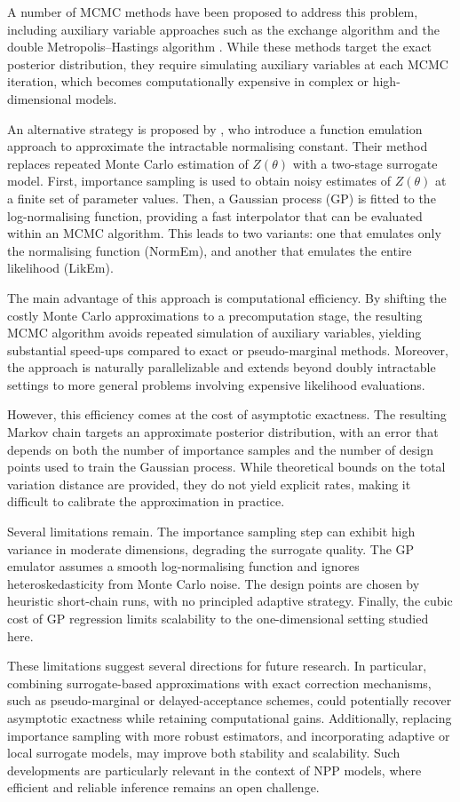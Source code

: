 A number of MCMC methods have been proposed to address this problem, including auxiliary variable approaches such as the exchange algorithm and the double Metropolis--Hastings algorithm \cite{liang2009}.
While these methods target the exact posterior distribution, they require simulating auxiliary variables at each MCMC iteration, which becomes computationally expensive in complex or high-dimensional models.

An alternative strategy is proposed by , who introduce a function emulation approach to approximate the intractable normalising constant. Their method replaces repeated Monte Carlo estimation of $Z(\theta)$ with a two-stage surrogate model.
First, importance sampling is used to obtain noisy estimates of $Z(\theta)$ at a finite set of parameter values.
Then, a Gaussian process (GP) is fitted to the log-normalising function, providing a fast interpolator that can be evaluated within an MCMC algorithm.
This leads to two variants: one that emulates only the normalising function (NormEm), and another that emulates the entire likelihood (LikEm).

The main advantage of this approach is computational efficiency.
By shifting the costly Monte Carlo approximations to a precomputation stage, the resulting MCMC algorithm avoids repeated simulation of auxiliary variables, yielding substantial speed-ups compared to exact or pseudo-marginal methods.
Moreover, the approach is naturally parallelizable and extends beyond doubly intractable settings to more general problems involving expensive likelihood evaluations.

However, this efficiency comes at the cost of asymptotic exactness.
The resulting Markov chain targets an approximate posterior distribution, with an error that depends on both the number of importance samples and the number of design points used to train the Gaussian process.
While theoretical bounds on the total variation distance are provided, they do not yield explicit rates, making it difficult to calibrate the approximation in practice.

Several limitations remain.
The importance sampling step can exhibit high variance in moderate dimensions, degrading the surrogate quality.
The GP emulator assumes a smooth log-normalising function and ignores heteroskedasticity from Monte Carlo noise.
The design points are chosen by heuristic short-chain runs, with no principled adaptive strategy.
Finally, the cubic cost of GP regression limits scalability to the one-dimensional setting studied here.

These limitations suggest several directions for future research.
In particular, combining surrogate-based approximations with exact correction mechanisms, such as pseudo-marginal or delayed-acceptance schemes, could potentially recover asymptotic exactness while retaining computational gains.
Additionally, replacing importance sampling with more robust estimators, and incorporating adaptive or local surrogate models, may improve both stability and scalability.
Such developments are particularly relevant in the context of NPP models, where efficient and reliable inference remains an open challenge.